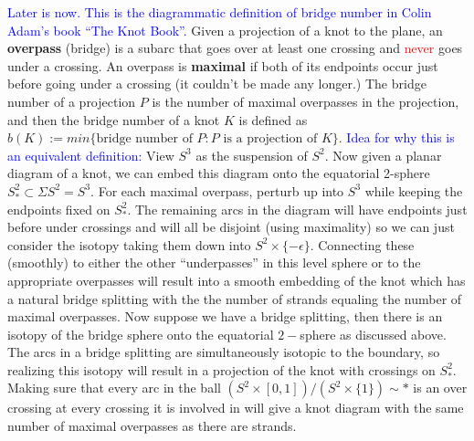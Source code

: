 \documentclass[11pt, oneside]{article}
\begin{document}
\textcolor{blue}{Later is now. This is the diagrammatic definition of bridge number in Colin Adam's book ``The Knot Book''.} Given a projection of a knot to the plane, an \textbf{overpass} (bridge) is a subarc that goes over at least one crossing and \textcolor{red}{never} goes under a crossing. An overpass is \textbf{maximal} if both of its endpoints occur just before going under a crossing (it couldn't be made any longer.) The bridge number of a projection $P$ is the number of maximal overpasses in the projection, and then the bridge number of a knot $K$ is defined as $b(K) := min\{\text{bridge number of }P : P \text{ is a projection of }K \}.$ \newline \newline \textcolor{blue}{Idea for why this is an equivalent definition:} View $S^{3}$ as the suspension of $S^{2}.$ Now given a planar diagram of a knot, we can embed this diagram onto the equatorial 2-sphere $S_{*}^{2} \subset \Sigma S^{2} = S^{3}.$ For each maximal overpass, perturb up into $S^{3}$ while keeping the endpoints fixed on $S_{*}^{2}.$ The remaining arcs in the diagram will have endpoints just before under crossings and will all be disjoint (using maximality) so we can just consider the isotopy taking them down into $S^{2} \times \{-\epsilon\}.$ Connecting these (smoothly) to either the other ``underpasses'' in this level sphere or to the appropriate overpasses will result into a smooth embedding of the knot which has a natural bridge splitting with the the number of strands equaling the number of maximal overpasses. Now suppose we have a bridge splitting, then there is an isotopy of the bridge sphere onto the equatorial $2-$sphere as discussed above. The arcs in a bridge splitting are simultaneously isotopic to the boundary, so realizing this isotopy will result in a projection of the knot with crossings on $S_{*}^{2}.$ Making sure that every arc in the ball $(S^{2} \times [0, 1])/ (S^{2} \times \{1\}) \sim *$ is an over crossing at every crossing it is involved in will give a knot diagram with the same number of maximal overpasses as there are strands.
\end{document}
